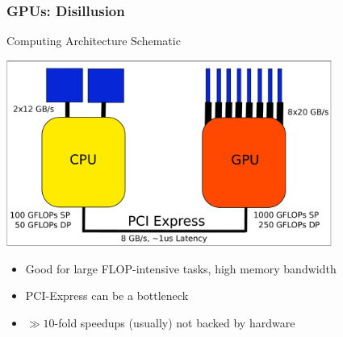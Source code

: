 

\begin{frame}[fragile]
\frametitle{GPUs: Disillusion}
 \begin{block}{Computing Architecture Schematic}
  \begin{center}
   \includegraphics[width=0.8\textwidth]{figures/cpu-gpu-detail.pdf}
  \end{center}

 \begin{itemize}
  \item Good for large FLOP-intensive tasks, high memory bandwidth
  \item PCI-Express can be a bottleneck
  \item $\gg 10$-fold speedups (usually) not backed by hardware
 \end{itemize}
 \end{block}

\end{frame}

